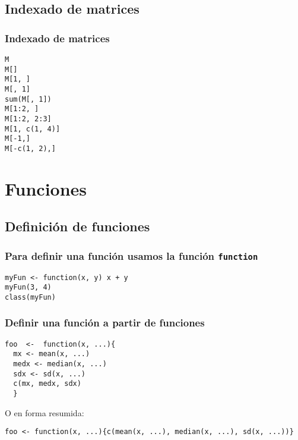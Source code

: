 \documentclass[bigger]{beamer}
\begin{document}
\subsection{Indexado de matrices}
\label{sec-2-3}
\begin{frame}[fragile]
\frametitle{Indexado de matrices}
\label{sec-2-3-1}


\lstset{language=R}
\begin{lstlisting}
M
M[]
M[1, ]
M[, 1]
sum(M[, 1])
M[1:2, ]
M[1:2, 2:3]
M[1, c(1, 4)]
M[-1,]
M[-c(1, 2),]
\end{lstlisting}
    
\end{frame}
\section{Funciones}
\label{sec-3}
\subsection{Definición de funciones}
\label{sec-3-1}
\begin{frame}[fragile]
\frametitle{Para definir una función usamos la función \texttt{function}}
\label{sec-3-1-1}


\lstset{language=R}
\begin{lstlisting}
myFun <- function(x, y) x + y
myFun(3, 4)
class(myFun)
\end{lstlisting}
\end{frame}
\begin{frame}[fragile]
\frametitle{Definir una función a partir de funciones}
\label{sec-3-1-2}


\lstset{language=R}
\begin{lstlisting}
foo  <-  function(x, ...){
  mx <- mean(x, ...)
  medx <- median(x, ...)
  sdx <- sd(x, ...)
  c(mx, medx, sdx)
  }
\end{lstlisting}
O en forma resumida:

\lstset{language=R}
\begin{lstlisting}
foo <- function(x, ...){c(mean(x, ...), median(x, ...), sd(x, ...))}
\end{lstlisting}
\end{frame}
\end{document}
